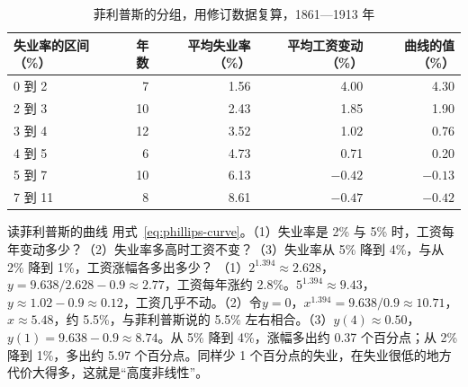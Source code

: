 \begin{table}[tbp]
\centering\small
\caption{菲利普斯的分组，用修订数据复算，1861—1913 年}\label{tab:phillips-crosses}
\begin{tabularx}{\linewidth}{@{}X r r r r@{}}
\toprule
失业率的区间（\%） & 年数 & 平均失业率（\%） & 平均工资变动（\%） & 曲线的值（\%） \\
\midrule
0 到 2 & 7 & 1.56 & 4.00 & 4.30 \\
2 到 3 & 10 & 2.43 & 1.85 & 1.90 \\
3 到 4 & 12 & 3.52 & 1.02 & 0.76 \\
4 到 5 & 6 & 4.73 & 0.71 & 0.20 \\
5 到 7 & 10 & 6.13 & $-0.42$ & $-0.13$ \\
7 到 11 & 8 & 8.61 & $-0.47$ & $-0.42$ \\
\bottomrule
\end{tabularx}
\end{table}


\begin{example}{读菲利普斯的曲线}\label{ex:phillips-read}
用式~\eqref{eq:phillips-curve}。（1）失业率是 2\% 与 5\% 时，工资每年变动多少？（2）失业率多高时工资不变？（3）失业率从 5\% 降到 4\%，与从 2\% 降到 1\%，工资涨幅各多出多少？
\solution
（1）$2^{1.394}\approx2.628$，$y=9.638/2.628-0.9\approx2.77$，工资每年涨约 2.8\%。$5^{1.394}\approx9.43$，$y\approx1.02-0.9\approx0.12$，工资几乎不动。（2）令$y=0$，$x^{1.394}=9.638/0.9\approx10.71$，$x\approx5.48$，约 5.5\%，与菲利普斯说的 5.5\% 左右相合\cite{phillips1958}。（3）$y(4)\approx0.50$，$y(1)=9.638-0.9\approx8.74$。从 5\% 降到 4\%，涨幅多出约 0.37 个百分点；从 2\% 降到 1\%，多出约 5.97 个百分点。同样少 1 个百分点的失业，在失业很低的地方代价大得多，这就是“高度非线性”。
\end{example}

